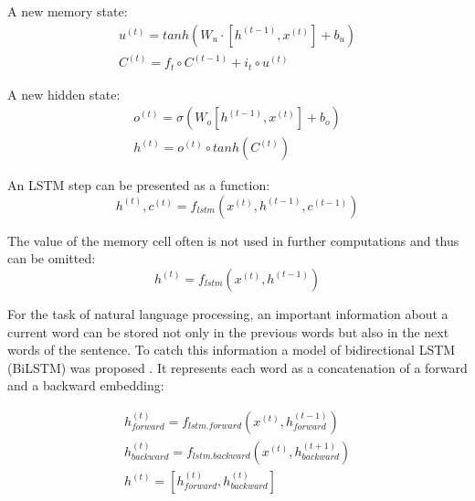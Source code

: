 A new memory state:
\begin{equation}
\begin{gathered}
u^{(t)} = tanh(W_u\cdot[h^{(t-1)}, x^{(t)}]+b_u) \\

C^{(t)} = f_t\circ C^{(t-1)}+i_t\circ u^{(t)}
\end{gathered}
\label{lstm:c}
\end{equation} 

A new hidden state:
\begin{equation}
\begin{gathered}
o^{(t)}=\sigma(W_o[h^{(t-1)},x^{(t)}]+b_o) \\

h^{(t)}=o^{(t)}\circ tanh(C^{(t)})
\end{gathered}
\label{lstm:h}
\end{equation} 

An LSTM step can be presented as a function:
\begin{equation}
h^{(t)}, c^{(t)} = f_{lstm}(x^{(t)}, h^{(t-1)}, c^{(t-1)})
\end{equation}

The value of the memory cell often is not used in  further computations and thus can be omitted:
\begin{equation}
h^{(t)} = f_{lstm}(x^{(t)}, h^{(t-1)})
\end{equation}

For the task of natural language processing, an important information about a current word can be stored not only in the previous words but also in the next words of the sentence. To catch this information a model of bidirectional LSTM (BiLSTM) was proposed  \parencite{schuster1997, graves2005}. It represents each word as a concatenation of a forward and a backward embedding:

\begin{equation}
\begin{gathered}
h_{forward}^{(t)} = f_{lstm.forward}(x^{(t)}, h^{(t-1)}_{forward}) \\
h_{backward}^{(t)} = f_{lstm.backward}(x^{(t)}, h^{(t+1)}_{backward}) \\

h^{(t)} = [h_{forward}^{(t)}, h_{backward}^{(t)} ]
\end{gathered}
\end{equation}

